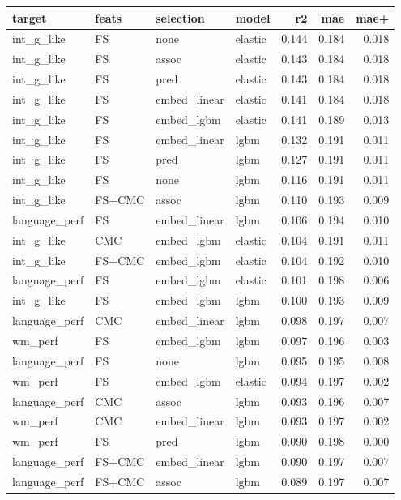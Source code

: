 \documentclass{article}
\begin{document}
\begin{table}
\centering
\begin{tabular}{llllrrr}
	\toprule
	target & feats & selection & model & r2 & mae & mae+ \\
	\midrule
	int\_g\_like & FS & none & elastic & 0.144 & 0.184 & 0.018 \\
	int\_g\_like & FS & assoc & elastic & 0.143 & 0.184 & 0.018 \\
	int\_g\_like & FS & pred & elastic & 0.143 & 0.184 & 0.018 \\
	int\_g\_like & FS & embed\_linear & elastic & 0.141 & 0.184 & 0.018 \\
	int\_g\_like & FS & embed\_lgbm & elastic & 0.141 & 0.189 & 0.013 \\
	int\_g\_like & FS & embed\_linear & lgbm & 0.132 & 0.191 & 0.011 \\
	int\_g\_like & FS & pred & lgbm & 0.127 & 0.191 & 0.011 \\
	int\_g\_like & FS & none & lgbm & 0.116 & 0.191 & 0.011 \\
	int\_g\_like & FS+CMC & assoc & lgbm & 0.110 & 0.193 & 0.009 \\
	language\_perf & FS & embed\_linear & lgbm & 0.106 & 0.194 & 0.010 \\
	int\_g\_like & CMC & embed\_lgbm & elastic & 0.104 & 0.191 & 0.011 \\
	int\_g\_like & FS+CMC & embed\_lgbm & elastic & 0.104 & 0.192 & 0.010 \\
	language\_perf & FS & embed\_lgbm & elastic & 0.101 & 0.198 & 0.006 \\
	int\_g\_like & FS & embed\_lgbm & lgbm & 0.100 & 0.193 & 0.009 \\
	language\_perf & CMC & embed\_linear & lgbm & 0.098 & 0.197 & 0.007 \\
	wm\_perf & FS & embed\_lgbm & lgbm & 0.097 & 0.196 & 0.003 \\
	language\_perf & FS & none & lgbm & 0.095 & 0.195 & 0.008 \\
	wm\_perf & FS & embed\_lgbm & elastic & 0.094 & 0.197 & 0.002 \\
	language\_perf & CMC & assoc & lgbm & 0.093 & 0.196 & 0.007 \\
	wm\_perf & CMC & embed\_linear & lgbm & 0.093 & 0.197 & 0.002 \\
	wm\_perf & FS & pred & lgbm & 0.090 & 0.198 & 0.000 \\
	language\_perf & FS+CMC & embed\_linear & lgbm & 0.090 & 0.197 & 0.007 \\
	language\_perf & FS+CMC & assoc & lgbm & 0.089 & 0.197 & 0.007 \\

\end{tabular}
\end{table}
\end{document}
